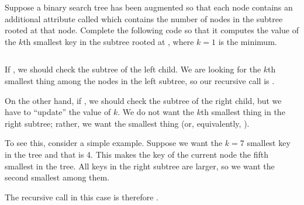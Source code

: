 \begin{prob}
    Suppose a binary search tree has been augmented so that each node contains an
    additional attribute called  which contains the number of nodes
    in the subtree rooted at that node. Complete the following code
    so that it computes the value of the $k$th smallest key in the subtree
    rooted at , where $k = 1$ is the minimum.

    \inputminted{python}{\thisdir/include/order_statistic.py}

    \begin{soln}
        If , we should check the subtree of the left child. We
        are looking for the $k$th smallest thing among the nodes in the left subtree,
        so our recursive call is .

        On the other hand,
        if , we should check the subtree of the right child, but we
        have to ``update'' the value of $k$. We do not want the $k$th smallest thing
        in the right subtree; rather, we want the  smallest thing (or,
        equivalently, ).

        To see this, consider a simple example. Suppose we want the $k = 7$ smallest
        key in the tree and that  is 4. This makes the key
        of the current node the fifth smallest in the tree. All keys in the right subtree
        are larger, so we want the second smallest among them.

        The recursive call in this case is therefore .
    \end{soln}
\end{prob}
